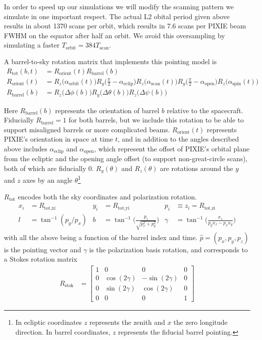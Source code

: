 \documentclass{article}
\begin{document}
In order to speed up our simulations we will modify the scanning pattern we
simulate in one important respect. The actual L2 obital
period given above results in about 1370 scans per orbit, which results in
7.6 scans per PIXIE beam FWHM on the equator after half an orbit. We avoid
this oversampling by simulating a faster $T_\textrm{orbit} = 384 T_\textrm{scan}$.

A barrel-to-sky rotation matrix that implements this pointing model is
\begin{align}
	R_\textrm{tot}(b,t)  &= R_\textrm{orient}(t)R_\textrm{barrel}(b) \\
	R_\textrm{orient}(t) &= R_z\big(\alpha_\textrm{orbit}(t)\big)
		R_y\Big(\frac\pi2-\alpha_\textrm{eclip}\Big)
		R_z\big(\alpha_\textrm{scan}(t)\big)R_y\Big(\frac\pi2-\alpha_\textrm{open}\Big)
		R_z\big(\alpha_\textrm{spin}(t)\big) \\
	R_\textrm{barrel}(b) &= R_z\big(\Delta\phi(b)\big)R_y\big(\Delta\theta(b)\big)R_z\big(\Delta\psi(b)\big) \label{eq:barrel}
\end{align}

Here $R_\textrm{barrel}(b)$ represents the orientation of barrel $b$ relative
to the spacecraft. Fiducially $R_\textrm{barrel} = 1$ for both barrels, but
we include this rotation to be able to support misaligned barrels or more
complicated beams. $R_\textrm{orient}(t)$ represents PIXIE's orientation
in space at time $t$, and in addition to the angles described above includes
$\alpha_\textrm{eclip}$ and $\alpha_\textrm{open}$, which represent the
offset of PIXIE's orbital plane from the ecliptic and the opening angle
offset (to support non-great-circle scans), both of which are fiducially 0.
$R_y(\theta)$ and $R_z(\theta)$ are rotations around the $y$ and $z$ axes
by an angle $\theta$\footnote{In ecliptic coordinates $z$ represents the
zenith and $x$ the zero longitude direction. In barrel coordinates, $z$
represents the fiducial barrel pointing.}

$R_\textrm{tot}$ encodes both the sky coordinates and polarization rotation.
\begin{align}
	x_i &= R_\textrm{tot,xi} & y_i &= R_\textrm{tot,yi} & p_i &\equiv z_i = R_\textrm{tot,zi} \\
	l        &= \tan^{-1}(p_y/p_x)  &
	b        &= \tan^{-1}\Big(\frac{p_z}{\sqrt{p_x^2+p_y^2}}\Big) &
	\gamma   &= \tan^{-1}\Big(\frac{x_z}{p_y x_x - p_x x_y}\Big)
\end{align}
with all the above being a function of the barrel index and time.
$\hat p = (p_x,p_y,p_z)$ is the pointing vector and $\gamma$ is the
polarization basis rotation, and corresponds to a Stokes rotation
matrix
\begin{align}
	R_\textrm{stok} &= \begin{bmatrix}
		1 & 0 & 0 & 0\\
		0 & \cos(2\gamma) & -\sin(2\gamma) & 0\\
		0 & \sin(2\gamma) & \cos(2\gamma) & 0 \\
		0 & 0 & 0 & 1
	\end{bmatrix}
\end{align}
\end{document}
